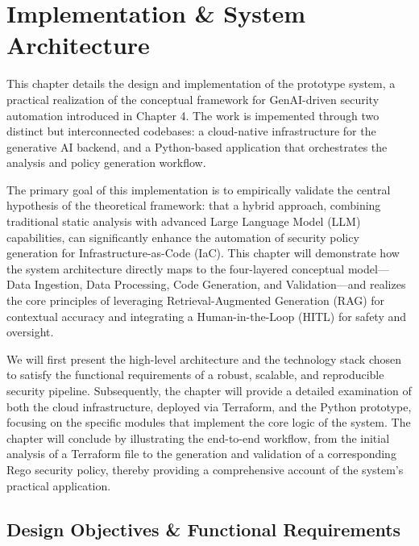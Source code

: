 \chapter{Implementation & System Architecture}


This chapter details the design and implementation of the prototype system, a practical realization of the conceptual framework for GenAI-driven security automation introduced in Chapter 4. The work is impemented through two distinct but interconnected codebases: a cloud-native infrastructure for the generative AI backend, and a Python-based application that orchestrates the analysis and policy generation workflow.

The primary goal of this implementation is to empirically validate the central hypothesis of the theoretical framework: that a hybrid approach, combining traditional static analysis with advanced Large Language Model (LLM) capabilities, can significantly enhance the automation of security policy generation for Infrastructure-as-Code (IaC). This chapter will demonstrate how the system architecture directly maps to the four-layered conceptual model—Data Ingestion, Data Processing, Code Generation, and Validation—and realizes the core principles of leveraging Retrieval-Augmented Generation (RAG) for contextual accuracy and integrating a Human-in-the-Loop (HITL) for safety and oversight.

We will first present the high-level architecture and the technology stack chosen to satisfy the functional requirements of a robust, scalable, and reproducible security pipeline. Subsequently, the chapter will provide a detailed examination of both the cloud infrastructure, deployed via Terraform, and the Python prototype, focusing on the specific modules that implement the core logic of the system. The chapter will conclude by illustrating the end-to-end workflow, from the initial analysis of a Terraform file to the generation and validation of a corresponding Rego security policy, thereby providing a comprehensive account of the system's practical application.

\section{Design Objectives & Functional Requirements}

